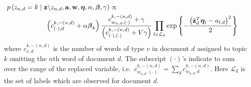 \begin{eqnarray}
\lefteqn{p\left(z_{n,d}=k\mid\mathbf{z}\backslash z_{n,d},\mathbf{a},\mathbf{w},\mathbf{\boldsymbol\eta},\alpha,\boldsymbol\beta,\gamma\right)\propto}\nonumber \\
 & \hspace{2cm}\left(c_{\left(\cdot\right),d}^{k,-\left(n,d\right)}+\alpha\boldsymbol\beta_{k}\right)\frac{c_{w_{n,d},\left(\cdot\right)}^{k,-\left(n,d\right)}+\gamma}{\left(c_{\left(\cdot\right),\left(\cdot\right)}^{k,-\left(n,d\right)}+V\gamma\right)}\prod_{l\in\mathcal{L}_{d}}\exp\left\{ -\frac{\left(\bar{\mathbf{z}}_{d}^{T}\boldsymbol\eta_{l}-a_{l,d}\right)^{2}}{2}\right\} \label{eq:z-likelihood}\end{eqnarray}
 where $c_{v,d}^{k,-\left(n,d\right)}$ is the number
of words of type $v$ in document $d$ assigned to topic $k$ omitting
the $n$th word of document $d$. The subscript $(\cdot)$'s
indicate to sum over the range of the replaced variable, i.e.~$ {c_{w_{n,d},\left(\cdot\right)}^{k,-\left(n,d\right)}} = \sum_d {c_{w_{n,d},d}^{k,-\left(n,d\right)}}$.  Here $\mathcal{L}_{d}$ is the set of labels which are observed for document $d$.


